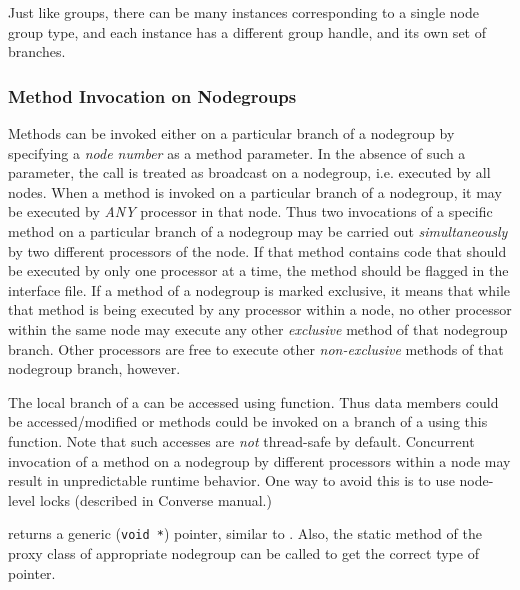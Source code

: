 Just like groups, there can be many instances corresponding to a single node
group type, and each instance has a different group handle, and its own set of
branches.


\subsubsection{Method Invocation on Nodegroups}

Methods can be invoked either on a particular branch of a
nodegroup by specifying a {\em node number} as a method
parameter. In the absence of such a parameter, the call is treated as broadcast
on a nodegroup, i.e. executed by all nodes. When a method is
invoked on a particular branch of a nodegroup,
it may be executed by {\em ANY} processor in that node. Thus two invocations of
a specific method on a particular branch of a
nodegroup may be carried out {\em simultaneously} by two
different processors of the node. If that method contains code that should be
executed by only one processor at a time, the method should be flagged
 in the interface file. If a method  of a
nodegroup  is marked exclusive, it means that while that method is being
executed by any processor within a node, no other processor within the same
node may execute any other {\em exclusive} method of that
nodegroup branch.  Other processors are free to
execute other {\em non-exclusive} methods of that nodegroup
branch, however.

The local branch of a  can be accessed using
 function. Thus data members could be accessed/modified
or methods could be invoked on a branch of a  using
this function. Note that such accesses are {\em not} thread-safe by default.
Concurrent invocation of a method on a nodegroup by different
processors within a node may result in unpredictable runtime behavior.  One way
to avoid this is to use node-level locks (described in Converse manual.)

 returns a generic ({\tt void *}) pointer, similar to
.  Also, the static method  of the
proxy class of appropriate nodegroup can be called to get the
correct type of pointer.
